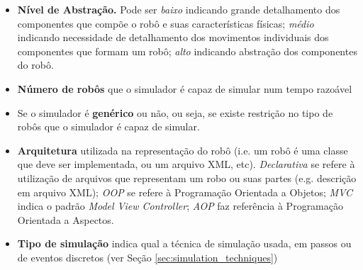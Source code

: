 \begin{itemize}
    \item \textbf{Nível de Abstração.} Pode ser \emph{baixo} indicando grande detalhamento dos componentes que compõe o robô e suas características físicas; \emph{médio} indicando necessidade de detalhamento dos movimentos individuais dos componentes que formam um robô; \emph{alto} indicando abstração dos componentes do robô.
    \item \textbf{Número de robôs} que o simulador é capaz de simular num tempo razoável
    \item Se o simulador é \textbf{genérico} ou não, ou seja, se existe restrição no tipo de robôs que o simulador é capaz de simular.
    \item \textbf{Arquitetura} utilizada na representação do robô (i.e. um robô é uma classe que deve ser implementada, ou um arquivo XML, etc). \emph{Declarativa} se refere à utilização de arquivos que representam um robo ou suas partes (e.g. descrição em arquivo XML); \emph{OOP} se refere à Programação Orientada a Objetos; \emph{MVC} indica o padrão \textit{Model View Controller}; \emph{AOP} faz referência à Programação Orientada a Aspectos.
    \item \textbf{Tipo de simulação} indica qual a técnica de simulação usada, em passos ou de eventos discretos (ver Seção \ref{sec:simulation_techniques})
\end{itemize}

